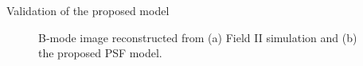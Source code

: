 {\begin{block}{Validation of the proposed model}
\begin{figure}
		\caption{B-mode image reconstructed from (a) Field II simulation and (b) the proposed PSF model.}
	\end{figure}
\end{block}
}%